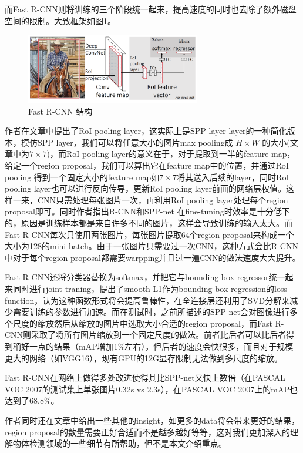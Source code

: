\documentclass[10pt,twocolumn,letterpaper]{article}
\begin{document}
而Fast R-CNN则将训练的三个阶段统一起来，提高速度的同时也去除了额外磁盘空间的限制。大致框架如图\ref{figure:frcn}。
\begin{figure}[htbp] %
   \centering
   \includegraphics[width=3in]{frcn.png} 
   \caption{Fast R-CNN 结构}
   \label{figure:frcn}
\end{figure}

作者在文章中提出了RoI pooling layer，这实际上是SPP layer layer的一种简化版本，模仿SPP layer，我们可以将任意大小的图片max pooling成 $H\times W$ 的大小(文章中为$7\times 7$)，而RoI pooling layer的意义在于，对于提取到一半的feature map，给定一个region proposal，我们可以算出它在feature map中的位置，并通过RoI pooling 得到一个固定大小的feature map如$7\times 7$将其送入后续的layer，同时RoI pooling layer也可以进行反向传导，更新RoI pooling layer前面的网络层权值。这样一来，CNN只需处理每张图片一次，再利用RoI pooling layer处理每个region proposal即可。同时作者指出R-CNN和SPP-net 在fine-tuning时效率是十分低下的，原因是训练样本都是来自许多不同的图片，这样会导致训练的输入太大。而Fast R-CNN每次只使用两张图片，每张图片提取64个region proposal来构成一个大小为128的mini-batch。由于一张图片只需要过一次CNN，这种方式会比R-CNN中对于每个region proposal都需要warpping并且过一遍CNN的做法速度大大提升。

Fast R-CNN还将分类器替换为softmax，并把它与bounding box regressor统一起来同时进行joint traning，提出了smooth-L1作为bounding box regression的loss function，认为这种函数形式将会提高鲁棒性，在全连接层还利用了SVD分解来减少需要训练的参数进行加速。而在测试时，之前所描述的SPP-net会对图像进行多个尺度的缩放然后从缩放的图片中选取大小合适的region proposal，而Fast R-CNN则采取了将所有图片缩放到一个固定尺度的做法。前者比后者可以比后者得到稍好一点的结果（mAP增加1\%左右），但后者的速度会快很多，而且对于规模更大的网络（如VGG16），现有GPU的12G显存限制无法做到多尺度的缩放。

Fast R-CNN在网络上做得多处改进使得其比SPP-net又快上数倍（在PASCAL VOC 2007的测试集上单张图片0.32s vs 2.3s），在PASCAL VOC 2007上的mAP也达到了68.8\%。

作者同时还在文章中给出一些其他的insight，如更多的data将会带来更好的结果，region proposal的数量需要正好合适而不是越多越好等等，这对我们更加深入的理解物体检测领域的一些细节有所帮助，但不是本文介绍重点。
\end{document}
